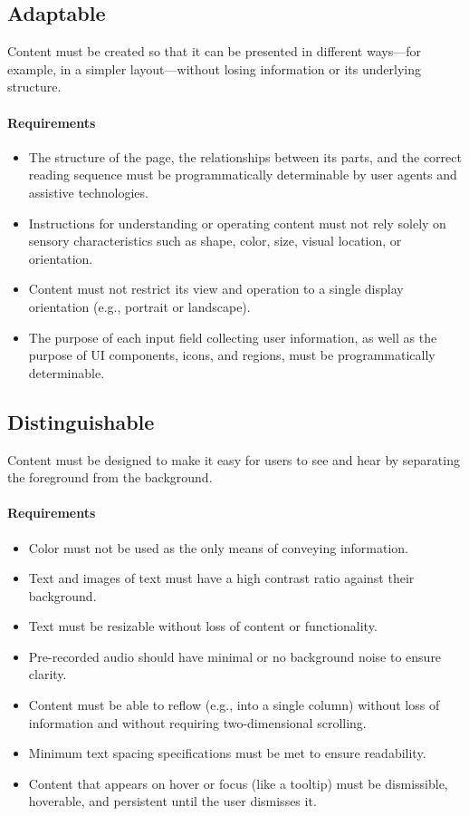 \documentclass{scrbook}
\begin{document}
\subsection{Adaptable}
Content must be created so that it can be presented in different ways—for example, in a simpler layout—without losing information or its underlying structure.

\paragraph{Requirements}
\begin{itemize}
    \item The structure of the page, the relationships between its parts, and the correct reading sequence must be programmatically determinable by user agents and assistive technologies.
    \item Instructions for understanding or operating content must not rely solely on sensory characteristics such as shape, color, size, visual location, or orientation.
    \item Content must not restrict its view and operation to a single display orientation (e.g., portrait or landscape).
    \item The purpose of each input field collecting user information, as well as the purpose of UI components, icons, and regions, must be programmatically determinable.
\end{itemize}

\subsection{Distinguishable}
Content must be designed to make it easy for users to see and hear by separating the foreground from the background.

\paragraph{Requirements}
\begin{itemize}
    \item Color must not be used as the only means of conveying information.
    \item Text and images of text must have a high contrast ratio against their background.
    \item Text must be resizable without loss of content or functionality.
    \item Pre-recorded audio should have minimal or no background noise to ensure clarity.
    \item Content must be able to reflow (e.g., into a single column) without loss of information and without requiring two-dimensional scrolling.
    \item Minimum text spacing specifications must be met to ensure readability.
    \item Content that appears on hover or focus (like a tooltip) must be dismissible, hoverable, and persistent until the user dismisses it.
\end{itemize}
\end{document}
